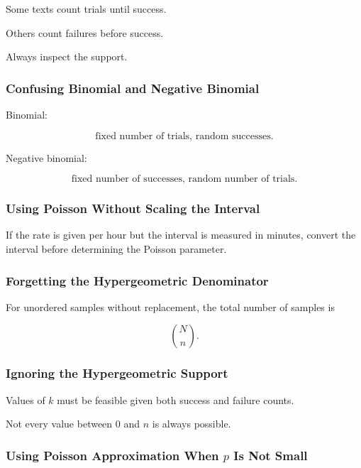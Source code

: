 Some texts count trials until success.

Others count failures before success.

Always inspect the support.

\subsubsection{Confusing Binomial and Negative Binomial}

Binomial:

\[
\boxed{
\text{fixed number of trials, random successes}.
}
\]

Negative binomial:

\[
\boxed{
\text{fixed number of successes, random number of trials}.
}
\]

\subsubsection{Using Poisson Without Scaling the Interval}

If the rate is given per hour but the interval is measured in minutes,
convert the interval before determining the Poisson parameter.

\subsubsection{Forgetting the Hypergeometric Denominator}

For unordered samples without replacement, the total number of samples
is

\[
\boxed{
\binom Nn.
}
\]

\subsubsection{Ignoring the Hypergeometric Support}

Values of \(k\) must be feasible given both success and failure counts.

Not every value between \(0\) and \(n\) is always possible.

\subsubsection{Using Poisson Approximation When \(p\) Is Not Small}


